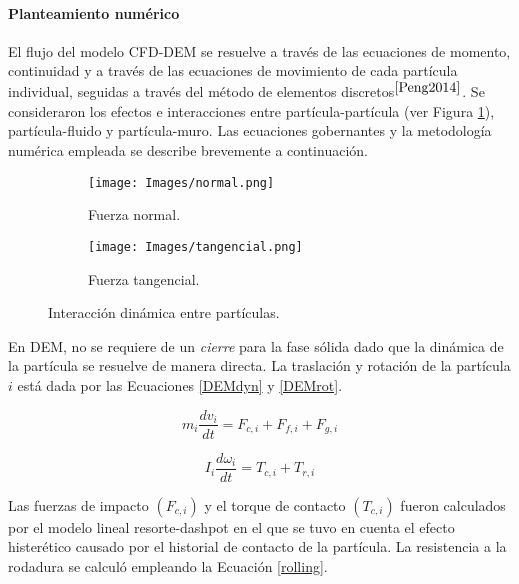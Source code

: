 \paragraph{Planteamiento num\'erico}

\noindent
\justify

El flujo del modelo CFD-DEM se resuelve a trav\'es de las ecuaciones de momento, continuidad y a trav\'es de las ecuaciones de movimiento de cada part\'icula individual, seguidas a trav\'es del m\'etodo de elementos discretos$^{\cite{Peng2014}}$. Se consideraron los efectos e interacciones entre part\'icula-part\'icula (ver Figura \ref{particula}), part\'icula-fluido y part\'icula-muro. Las ecuaciones gobernantes y la metodolog\'ia num\'erica empleada se describe brevemente a continuaci\'on.

\begin{figure}[h!]
	\centering
	\begin{subfigure}[b]{0.4\textwidth}
		\texttt{[image: Images/normal.png]}
		\caption{Fuerza normal.}
	\end{subfigure}
	\hfill
	\begin{subfigure}[b]{0.4\textwidth}
		\texttt{[image: Images/tangencial.png]}
		\caption{Fuerza tangencial.}
	\end{subfigure}
	\caption{Interacci\'on din\'amica entre part\'iculas.}
	\label{particula}
\end{figure}

\noindent
\justify

En DEM, no se requiere de un \textit{cierre} para la fase s\'olida dado que la din\'amica de la part\'icula se resuelve de manera directa. La traslaci\'on y rotaci\'on de la part\'icula $i$ est\'a dada por las Ecuaciones \ref{DEMdyn} y \ref{DEMrot}.

\begin{equation}
	m_i \frac{d v _i}{dt} = F_{c,i} + F_{f,i} + F_{g,i}
	\label{DEMdyn}
\end{equation}

\begin{equation}
	I_i \frac{d \omega _i}{dt} = T_{c,i} + T_{r,i}
	\label{DEMrot}
\end{equation}

\noindent
\justify

Las fuerzas de impacto $\left( F_{c,i} \right)$ y el torque de contacto $\left( T_{c,i} \right)$ fueron calculados por el modelo lineal resorte-dashpot en el que se tuvo en cuenta el efecto hister\'etico causado por el historial de contacto de la part\'icula. La resistencia a la rodadura se calcul\'o empleando la Ecuaci\'on \ref{rolling}.

